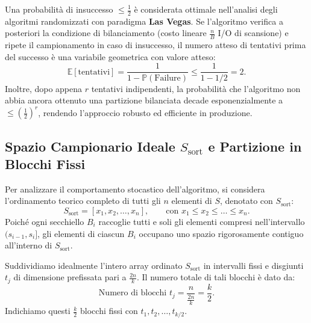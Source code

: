 \begin{property}
Una probabilità di insuccesso $\le \frac{1}{2}$ è considerata ottimale nell'analisi degli algoritmi randomizzati con paradigma \textbf{Las Vegas}. 
Se l'algoritmo verifica a posteriori la condizione di bilanciamento (costo lineare $\frac{n}{B}$ I/O di scansione) e ripete il campionamento in caso di insuccesso, il numero atteso di tentativi prima del successo è una variabile geometrica con valore atteso:
\begin{equation}
  \mathbb{E}[\text{tentativi}] = \frac{1}{1 - \mathbb{P}(\text{Failure})} \le \frac{1}{1 - 1/2} = 2.
\end{equation}
Inoltre, dopo appena $r$ tentativi indipendenti, la probabilità che l'algoritmo non abbia ancora ottenuto una partizione bilanciata decade esponenzialmente a $\le \left(\frac{1}{2}\right)^r$, rendendo l'approccio robusto ed efficiente in produzione.
\end{property}

\subsection{Spazio Campionario Ideale \texorpdfstring{$S_{\text{sort}}$}{S\_sort} e Partizione in Blocchi Fissi}
Per analizzare il comportamento stocastico dell'algoritmo, si considera l'ordinamento teorico completo di tutti gli $n$ elementi di $S$, denotato con $S_{\text{sort}}$:
\begin{equation}
  S_{\text{sort}} = [x_1, x_2, \dots, x_n], \qquad \text{con } x_1 \le x_2 \le \dots \le x_n.
\end{equation}
Poiché ogni secchiello $B_i$ raccoglie tutti e soli gli elementi compresi nell'intervallo $(s_{i-1}, s_i]$, gli elementi di ciascun $B_i$ occupano uno spazio rigorosamente contiguo all'interno di $S_{\text{sort}}$.

Suddividiamo idealmente l'intero array ordinato $S_{\text{sort}}$ in intervalli fissi e disgiunti $t_j$ di dimensione prefissata pari a $\frac{2n}{k}$. Il numero totale di tali blocchi è dato da:
\begin{equation}
  \text{Numero di blocchi } t_j = \frac{n}{\frac{2n}{k}} = \frac{k}{2}.
\end{equation}
Indichiamo questi $\frac{k}{2}$ blocchi fissi con $t_1, t_2, \dots, t_{k/2}$.

